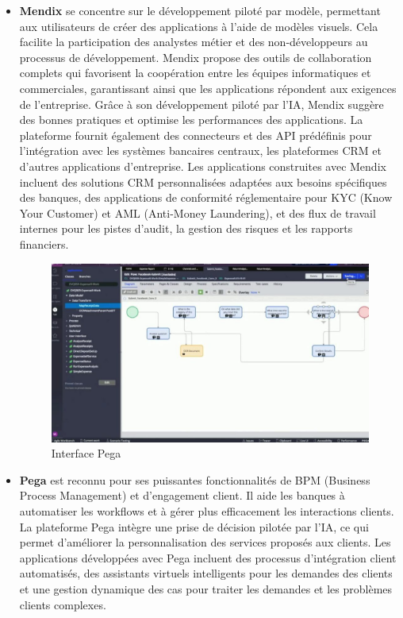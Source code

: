 \begin{itemize}
    \item \textbf{Mendix} se concentre sur le développement piloté par modèle, permettant aux utilisateurs de créer des applications à l'aide de modèles visuels. Cela facilite la participation des analystes métier et des non-développeurs au processus de développement. Mendix propose des outils de collaboration complets qui favorisent la coopération entre les équipes informatiques et commerciales, garantissant ainsi que les applications répondent aux exigences de l'entreprise. Grâce à son développement piloté par l'IA, Mendix suggère des bonnes pratiques et optimise les performances des applications. La plateforme fournit également des connecteurs et des API prédéfinis pour l'intégration avec les systèmes bancaires centraux, les plateformes CRM et d'autres applications d'entreprise. Les applications construites avec Mendix incluent des solutions CRM personnalisées adaptées aux besoins spécifiques des banques, des applications de conformité réglementaire pour KYC (Know Your Customer) et AML (Anti-Money Laundering), et des flux de travail internes pour les pistes d'audit, la gestion des risques et les rapports financiers.



          \begin{figure}[H]
              \centering
              \includegraphics[width=15cm]{Figures/pega.jpg}
              \caption{Interface Pega}
              \label{fig:my_label} %
          \end{figure}

    \item \textbf{Pega} est reconnu pour ses puissantes fonctionnalités de BPM (Business Process Management) et d'engagement client. Il aide les banques à automatiser les workflows et à gérer plus efficacement les interactions clients. La plateforme Pega intègre une prise de décision pilotée par l'IA, ce qui permet d'améliorer la personnalisation des services proposés aux clients. Les applications développées avec Pega incluent des processus d'intégration client automatisés, des assistants virtuels intelligents pour les demandes des clients et une gestion dynamique des cas pour traiter les demandes et les problèmes clients complexes.



\end{itemize}
